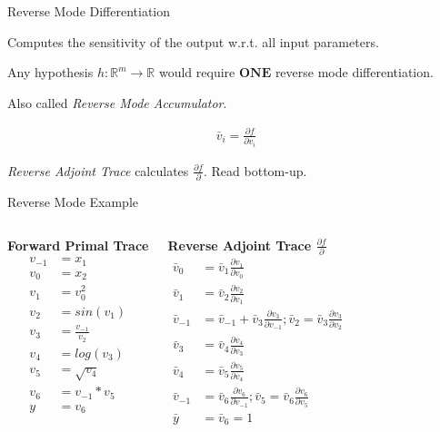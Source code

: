 \documentclass{beamer}
\begin{document}
\begin{frame}{Reverse Mode Differentiation}

Computes the sensitivity of the output w.r.t. all input parameters.

Any hypothesis $h: \mathbb{R}^m \to \mathbb{R}$ would require $\textbf{ONE}$ reverse
mode differentiation.

Also called \textit{Reverse Mode Accumulator}.

\begin{align}
\bar{v}_i = \frac{\partial f}{\partial v_i} \tag{adjoint of a variable}
\end{align}

\textit{Reverse Adjoint Trace} calculates $\frac{\partial f}{\partial}$. Read bottom-up.

\end{frame}

\begin{frame}{Reverse Mode Example}
\begin{columns}[T,onlytextwidth]
      \textbf{Forward Primal Trace}
      \begin{align*}
		v_{-1} &= x_1 \\
		v_0 &= x_2 \\
		v_1 &= v_0^2 \\
		v_2 &= sin(v_1) \\
		v_3 &= \frac{v_{-1}}{v_2} \\
		v_4 &= log(v_3) \\
		v_5 &= \sqrt{v_4} \\
		v_6 &= v_{-1} * v_5 \\
		y &= v_6
      \end{align*}

      \textbf{Reverse Adjoint Trace $\frac{\partial f}{\partial}$}
	  \begin{align*}
		\bar{v}_0 &= \bar{v}_1 \frac{\partial v_1}{\partial v_0} \\
		\bar{v}_1 &= \bar{v}_2 \frac{\partial v_2}{\partial v_1} \\
		\bar{v}_{-1} &= \bar{v}_{-1} + \bar{v}_3\frac{\partial v_3}{\partial v_{-1}}; \bar{v}_2 = \bar{v}_3\frac{\partial v_3}{\partial v_2} \\
		\bar{v}_3 &= \bar{v}_4 \frac{\partial v_4}{\partial v_3} \\
		\bar{v}_4 &= \bar{v}_5 \frac{\partial v_5}{\partial v_4} \\
		\bar{v}_{-1} &= \bar{v}_6 \frac{\partial v_6}{\partial v_{-1}}; \bar{v}_5 = \bar{v}_6 \frac{\partial v_6}{\partial v_5} \\
		\bar{y} &= \bar{v}_6 = 1
	  \end{align*}
\end{columns}
\end{frame}
\end{document}
